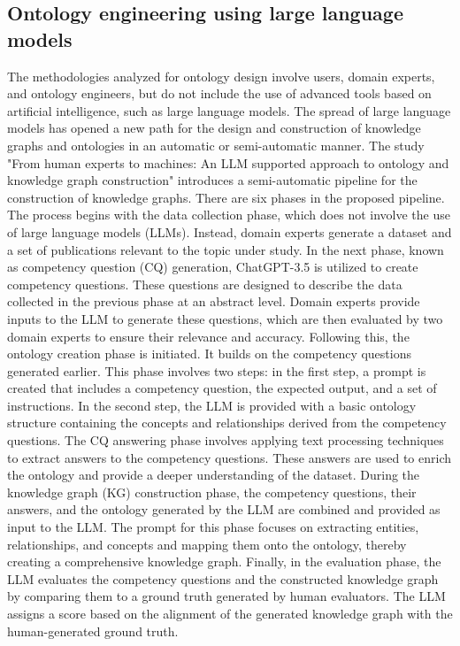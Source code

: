 \subsection{Ontology engineering using large language models}
The methodologies analyzed for ontology design involve users, domain experts, and ontology engineers, but do not include the use of advanced tools based on artificial intelligence, such as large language models. The spread of large language models has opened a new path for the design and construction of knowledge graphs and ontologies in an automatic or semi-automatic manner. The study "From human experts to machines: An LLM supported approach to ontology and knowledge graph construction"\cite{kommineni2024human} introduces a semi-automatic pipeline for the construction of knowledge graphs. There are six phases in the proposed pipeline.
The process begins with the data collection phase, which does not involve the use of large language models (LLMs). Instead, domain experts generate a dataset and a set of publications relevant to the topic under study.
In the next phase, known as competency question (CQ) generation, ChatGPT-3.5 is utilized to create competency questions. These questions are designed to describe the data collected in the previous phase at an abstract level. Domain experts provide inputs to the LLM to generate these questions, which are then evaluated by two domain experts to ensure their relevance and accuracy. Following this, the ontology creation phase is initiated. It builds on the competency questions generated earlier. This phase involves two steps: in the first step, a prompt is created that includes a competency question, the expected output, and a set of instructions. In the second step, the LLM is provided with a basic ontology structure containing the concepts and relationships derived from the competency questions.
The CQ answering phase involves applying text processing techniques to extract answers to the competency questions. These answers are used to enrich the ontology and provide a deeper understanding of the dataset.
During the knowledge graph (KG) construction phase, the competency questions, their answers, and the ontology generated by the LLM are combined and provided as input to the LLM. The prompt for this phase focuses on extracting entities, relationships, and concepts and mapping them onto the ontology, thereby creating a comprehensive knowledge graph.
Finally, in the evaluation phase, the LLM evaluates the competency questions and the constructed knowledge graph by comparing them to a ground truth generated by human evaluators. The LLM assigns a score based on the alignment of the generated knowledge graph with the human-generated ground truth.
